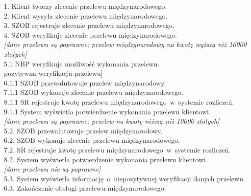 \begin{flushleft}
1. Klient tworzy zlecenie przelewu międzynarodowego.\\
2. Klient wysyła zlecenie przelewu międzynarodowego.\\
3. SZOB rejestruje zlecenie przelewu międzynarodowego.\\
4. SZOB weryfikuje zlecenie przelewu międzynarodowego.\\
\textit{{[}dane przelewu są poprawne; przelew międzynarodowy na kwotę wyższą niż 10000 złotych{]}}\\
\hspace{1ex}5.1 NBP weryfikuje możliwość wykonania przelewu.\\
\hspace{1ex}{[}pozytywna weryfikacja przelewu{]}\\
\hspace{2ex}6.1.1 SZOB przewalutowuje przelew międzynarodowy.\\
\hspace{2ex}7.1.1 SZOB wykonuje zlecenie przelewu międzynarodowego.\\
\hspace{2ex}8.1.1 SR rejestruje kwotę przelewu międzynarodowego~w~systemie rozliczeń.\\
\hspace{2ex}9.1.1 System wyświetla potwierdzenie wykonania przelewu klientowi.\\
\hspace{2ex}\textit{{[}dane przelewu są poprawne; przelew na kwotę niższą niż 10000 złotych{]}}\\
\hspace{1ex}5.2. SZOB przewalutowuje przelew międzynarodowy.\\
\hspace{1ex}6.2. SZOB wykonuje zlecenie przelewu międzynarodowego.\\
\hspace{1ex}7.2. SR rejestruje kwotę przelewu międzynarodowego~w~systemie rozliczeń.\\
\hspace{1ex}8.2. System wyświetla potwierdzenie wykonania przelewu klientowi.\\
\textit{{[}dane przelewu nie są poprawne{]}}\\
\hspace{1ex}5.3. System wyświetla informację~o~niepozytywnej weryfikacji danych przelewu.\\
\hspace{1ex}6.3. Zakończenie obsługi przelewu międzynarodowego.\\

\end{flushleft}
